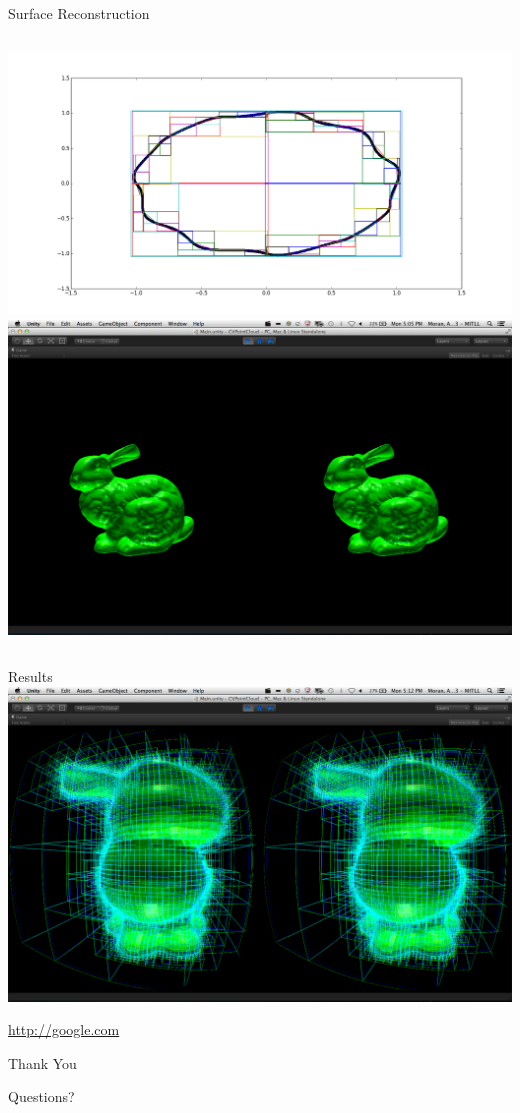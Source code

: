 \documentclass{beamer}
\begin{document}
\begin{frame}{Surface Reconstruction}
  \begin{columns}
    \includegraphics[width=\textwidth]{Images/quadtree.png}
    \includegraphics[width=\textwidth]{Images/bunny_front_meshReg.png}
  \end{columns}
\end{frame}


\begin{frame}{Results}
  \includegraphics[width=\textwidth]{Images/bunny_side_meshOctree.png}
  
  \url{http://google.com}
\end{frame}

\begin{frame}{Thank You}
\end{frame}

\begin{frame}{Questions?}
\end{frame}
  
\end{document}
